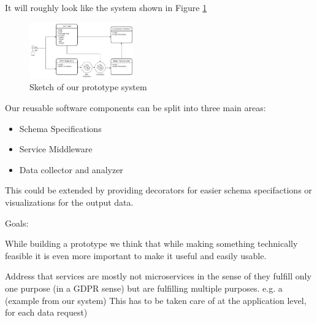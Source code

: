 It will roughly look like the system shown in Figure \ref{prototype_system}

\begin{figure}[htbp]
\centerline{\includegraphics[width=0.4\textwidth]{figures/prototype_system.png}}
\caption{Sketch of our prototype system}
\label{prototype_system}
\end{figure}

Our reusable software components can be split into three main areas: 

\begin{itemize}
    \item Schema Specifications
    \item Service Middleware 
    \item Data collector and analyzer 
\end{itemize}



This could be extended by providing decorators for easier schema specifactions or visualizations for the output data. 

    
    

Goals: 

While building a prototype we think that while making something technically feasible it is even more important to make it useful and easily usable. 

Address that services are mostly not microservices in the sense of they fulfill only one purpose (in a GDPR sense) but are fulfilling multiple purposes. e.g. a (example from our system) This has to be taken care of at the application level, for each data request) 

